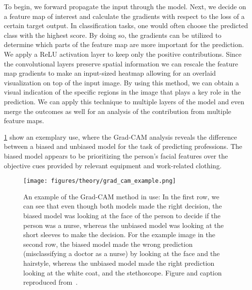 To begin, we forward propagate the input through the model. Next, we decide on a
feature map of interest and calculate the gradients with respect to the loss of
a certain target output. In classification tasks, one would often choose the
predicted class with the highest score. By doing so, the gradients can be
utilized to determine which parts of the feature map are more important for the
prediction. We apply a ReLU activation layer to keep only the
positive contributions. Since the convolutional layers preserve spatial
information we can rescale the feature map gradients to make an input-sized
heatmap allowing for an overlaid visualization on top of the input image. By using this method, we can obtain a visual indication of the specific regions in the image that plays a key role in the prediction. We can apply this technique to multiple layers of the model and even merge the outcomes as well for an analysis of the contribution from multiple feature maps.

\cref{fig:grad_cam_example} show an exemplary use, where the Grad-CAM analysis reveals the difference between a biased and unbiased model for the task of predicting professions. The biased model appears to be prioritizing the person's facial features over the objective cues provided by relevant equipment and work-related clothing.


\begin{figure}[!htb]
  \centering
  \texttt{[image: figures/theory/grad\_cam\_example.png]}
  \caption{An example of the Grad-CAM method in use: In the first row, we can see that even though both models made the right decision, the biased model was looking at the face of the person to decide if the person was a nurse, whereas the unbiased model was looking at the short sleeves to make the decision. For the example image in the second row, the biased model made the wrong prediction (misclassifying a doctor as a nurse) by looking at the face and the hairstyle, whereas the unbiased model made the right prediction looking at the white coat, and the stethoscope. Figure and caption reproduced from~\cite{Selvaraju_2019}. }
  \label{fig:grad_cam_example}
\end{figure}




